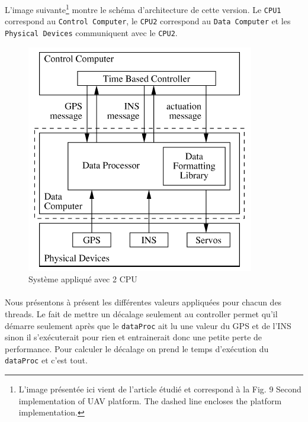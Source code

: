 \documentclass[a4paper,12pt]{report}
\begin{document}
			L'image suivante\footnote{L'image présentée ici vient de l'article étudié et correspond à la Fig. 9 Second implementation of UAV platform. The dashed line encloses the platform implementation.} montre le schéma d'architecture de cette version. Le \texttt{CPU1} correspond au \texttt{Control Computer}, le \texttt{CPU2} correspond au \texttt{Data Computer} et les \texttt{Physical Devices} communiquent avec le \texttt{CPU2}.
			\begin{figure}[H]
				\centering
					\includegraphics[scale=0.7]{cpu2.png}
					\caption{Système appliqué avec 2 CPU}
				\label{cpu2}
			\end{figure}
			
			
			\paragraph*{}
			Nous présentons à présent les différentes valeurs appliquées pour chacun des threads. Le fait de mettre un décalage seulement au controller permet qu'il démarre seulement après que le \texttt{dataProc} ait lu une valeur du GPS et de l'INS sinon il s'exécuterait pour rien et entrainerait donc une petite perte de performance. Pour calculer le décalage on prend le temps d'exécution du \texttt{dataProc} et c'est tout.
			
			\begin{table}[H]
			\centering
			\end{table}
			
\end{document}
